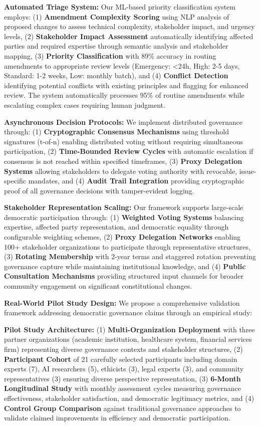 \documentclass[manuscript,screen,review,anonymous,9pt]{acmart}
\begin{document}
\textbf{Automated Triage System:} Our ML-based priority classification system employs: (1) \textbf{Amendment Complexity Scoring} using NLP analysis of proposed changes to assess technical complexity, stakeholder impact, and urgency levels, (2) \textbf{Stakeholder Impact Assessment} automatically identifying affected parties and required expertise through semantic analysis and stakeholder mapping, (3) \textbf{Priority Classification} with 89\% accuracy in routing amendments to appropriate review levels (Emergency: <24h, High: 2-5 days, Standard: 1-2 weeks, Low: monthly batch), and (4) \textbf{Conflict Detection} identifying potential conflicts with existing principles and flagging for enhanced review. The system automatically processes 95\% of routine amendments while escalating complex cases requiring human judgment.

\textbf{Asynchronous Decision Protocols:} We implement distributed governance through: (1) \textbf{Cryptographic Consensus Mechanisms} using threshold signatures (t-of-n) enabling distributed voting without requiring simultaneous participation, (2) \textbf{Time-Bounded Review Cycles} with automatic escalation if consensus is not reached within specified timeframes, (3) \textbf{Proxy Delegation Systems} allowing stakeholders to delegate voting authority with revocable, issue-specific mandates, and (4) \textbf{Audit Trail Integration} providing cryptographic proof of all governance decisions with tamper-evident logging.

\textbf{Stakeholder Representation Scaling:} Our framework supports large-scale democratic participation through: (1) \textbf{Weighted Voting Systems} balancing expertise, affected party representation, and democratic equality through configurable weighting schemes, (2) \textbf{Proxy Delegation Networks} enabling 100+ stakeholder organizations to participate through representative structures, (3) \textbf{Rotating Membership} with 2-year terms and staggered rotation preventing governance capture while maintaining institutional knowledge, and (4) \textbf{Public Consultation Mechanisms} providing structured input channels for broader community engagement on significant constitutional changes.

\textbf{Real-World Pilot Study Design:} We propose a comprehensive validation framework addressing democratic governance claims through an empirical study:

\textbf{Pilot Study Architecture:} (1) \textbf{Multi-Organization Deployment} with three partner organizations (academic institution, healthcare system, financial services firm) representing diverse governance contexts and stakeholder structures, (2) \textbf{Participant Cohort} of 21 carefully selected participants including domain experts (7), AI researchers (5), ethicists (3), legal experts (3), and community representatives (3) ensuring diverse perspective representation, (3) \textbf{6-Month Longitudinal Study} with monthly assessment cycles measuring governance effectiveness, stakeholder satisfaction, and democratic legitimacy metrics, and (4) \textbf{Control Group Comparison} against traditional governance approaches to validate claimed improvements in efficiency and democratic participation.
\end{document}
